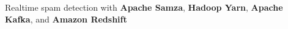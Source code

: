 \documentclass[]{peter_resume}
\begin{document}
\begin{minipage}{\textwidth}
 
\begin{tightemize}
    \item Realtime spam detection with \textbf{Apache Samza}, \textbf{Hadoop Yarn}, \textbf{Apache Kafka}, and \textbf{Amazon Redshift}
\end{tightemize}
\sectionsep

\end{minipage}
\end{document}
